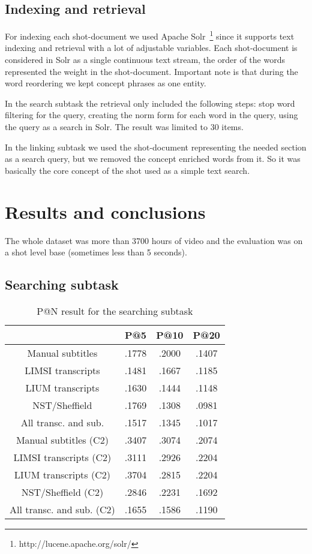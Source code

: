 \documentclass{acm_proc_article-me}
\begin{document}
\subsection{Indexing and retrieval}

For indexing each shot-document we used Apache Solr~\footnote{http://lucene.apache.org/solr/} since it supports text indexing and retrieval with a lot of adjustable variables. Each shot-document is considered in Solr as a single continuous text stream, the order of the words represented the weight in the shot-document. Important note is that during the word reordering we kept concept phrases as one entity.

In the search subtask the retrieval only included the following steps: stop word filtering for the query, creating the norm form for each word in the query, using the query as a search in Solr. The result was limited to 30 items.

In the linking subtask we used the shot-document representing the needed section as a search query, but we removed the concept enriched words from it. So it was basically the core concept of the shot used as a simple text search.

\section{Results and conclusions}

The whole dataset was more than 3700 hours of video and the evaluation was on a shot level base (sometimes less than 5 seconds).

\subsection{Searching subtask}

\begin{table}[h]
\begin{tabular}{|c|c|c|c|}
	\hline 
	& P@5 & P@10 & P@20\tabularnewline
	\hline 
	\hline 
	Manual subtitles & .1778 & .2000 & .1407\tabularnewline
	\hline 
	LIMSI transcripts & .1481 & .1667 & .1185\tabularnewline
	\hline 
	LIUM transcripts & .1630 & .1444 & .1148\tabularnewline
	\hline 
	NST/Sheffield & .1769 & .1308 & .0981\tabularnewline
	\hline 
	All transc. and sub. & .1517 & .1345 & .1017\tabularnewline
	\hline 
	Manual subtitles (C2) & .3407 & .3074 & .2074\tabularnewline
	\hline 
	LIMSI transcripts (C2) & .3111 & .2926 & .2204\tabularnewline
	\hline 
	LIUM transcripts (C2) & .3704 & .2815 & .2204\tabularnewline
	\hline 
	NST/Sheffield (C2) & .2846 & .2231 & .1692\tabularnewline	
	\hline 
	All transc. and sub. (C2) & .1655 & .1586 & .1190\tabularnewline	
	\hline 
\end{tabular}
\caption{P@N result for the searching subtask}
\end{table}
\end{document}
